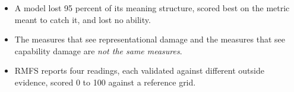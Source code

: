 \documentclass[aspectratio=169,11pt]{beamer}
\begin{document}
{
\begin{frame}
\vspace{20pt}
\color{white}\Large
\begin{itemize}\setlength\itemsep{14pt}
\item A model lost 95 percent of its meaning structure, scored best on
the metric meant to catch it, and lost no ability.
\item The measures that see representational damage and the measures
that see capability damage are \emph{not the same measures}.
\item RMFS reports four readings, each validated against different
outside evidence, scored 0 to 100 against a reference grid.
\end{itemize}
\end{frame}}
\end{document}
